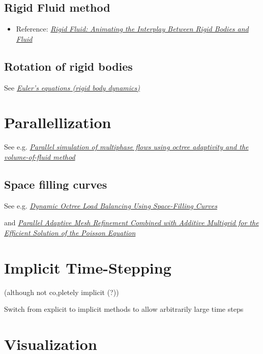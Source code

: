 \subsection{Rigid Fluid method}

\begin{itemize}
    \item Reference: \textit{\href{http://www.amath.unc.edu/Faculty/mucha/Reprints/siggraph04.pdf}{Rigid Fluid: Animating the Interplay Between Rigid Bodies and Fluid}}
\end{itemize}

\subsection{Rotation of rigid bodies}

See \textit{\href{http://en.wikipedia.org/wiki/Euler\%27s_equations_\%28rigid_body_dynamics\%29}{Euler's equations (rigid body dynamics)}}

\section{Parallellization}

See e.g. \textit{\href{http://gfs.sourceforge.net/papers/agbaglah2011.pdf}{Parallel simulation of multiphase flows using octree adaptivity and the volume-of-fluid method}}

\subsection{Space filling curves}

See e.g. \textit{\href{http://j.teresco.org/research/publications/octpart02/octpart02.pdf}{Dynamic Octree Load Balancing Using Space-Filling Curves}}

and \textit{\href{http://downloads.isrn.com/journals/appmath/2012/246491.pdf}{Parallel Adaptive Mesh Refinement Combined with Additive Multigrid for the Efficient Solution of the Poisson Equation}}

\section{Implicit Time-Stepping}

\SIMPLE (although not co,pletely implicit (?))

Switch from explicit to implicit methods to allow arbitrarily large time steps

\section{Visualization}

